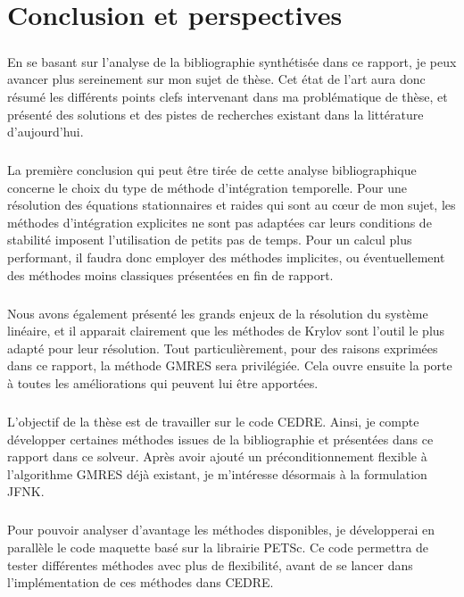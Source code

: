 \chapter{Conclusion et perspectives}

\paragraph{}
En se basant sur l'analyse de la bibliographie synthétisée dans ce rapport, je peux avancer plus sereinement sur mon sujet de thèse.
Cet état de l'art aura donc résumé les différents points clefs intervenant dans ma problématique de thèse, et présenté des solutions et des pistes de recherches existant dans la littérature d'aujourd'hui.

\paragraph{}
La première conclusion qui peut être tirée de cette analyse bibliographique concerne le choix du type de méthode d'intégration temporelle.
Pour une résolution des équations stationnaires et raides qui sont au cœur de mon sujet, les méthodes d'intégration explicites ne sont pas adaptées car leurs conditions de stabilité imposent l'utilisation de petits pas de temps.
Pour un calcul plus performant, il faudra donc employer des méthodes implicites, ou éventuellement des méthodes moins classiques présentées en fin de rapport.

\paragraph{}
Nous avons également présenté les grands enjeux de la résolution du système linéaire, et il apparait clairement que les méthodes de Krylov sont l'outil le plus adapté pour leur résolution.
Tout particulièrement, pour des raisons exprimées dans ce rapport, la méthode GMRES sera privilégiée.
Cela ouvre ensuite la porte à toutes les améliorations qui peuvent lui être apportées.

\paragraph{}
L'objectif de la thèse est de travailler sur le code CEDRE.
Ainsi, je compte développer certaines méthodes issues de la bibliographie et présentées dans ce rapport dans ce solveur.
Après avoir ajouté un préconditionnement flexible à l'algorithme GMRES déjà existant, je m'intéresse désormais à la formulation JFNK.

\paragraph{}
Pour pouvoir analyser d'avantage les méthodes disponibles, je développerai en parallèle le code maquette basé sur la librairie PETSc.
Ce code permettra de tester différentes méthodes avec plus de flexibilité, avant de se lancer dans l'implémentation de ces méthodes dans CEDRE.
